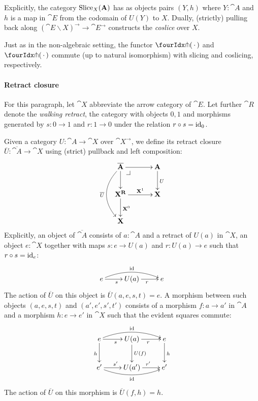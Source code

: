 \documentclass[reqno,10pt,a4paper,oneside]{amsart}
\begin{document}
Explicitly, the category $\operatorname{Slice}_X(\mathbf{A})$ has as objects pairs $(Y, h)$ where $Y : \cat{A}$ and $h$ is a map in $\cat{E}$ from the codomain of $U(Y)$ to $X$.
Dually, (strictly) pulling back along $(\cat{E} \backslash X)^{\to} \to \cat{E}^{\to}$ constructs the \emph{coslice} over $X$.

\begin{remark}
\label{pitchfork-slicing}
Just as in the non-algebraic setting, the functor $\liftr{\brarghole}$ and $\liftl{\brarghole}$ commute (up to natural isomorphism) with slicing and coslicing, respectively.
\end{remark}

\paragraph{Retract closure}

For this paragraph, let $\cat{X}$ abbreviate the arrow category of $\cat{E}$.
Let further $\cat{R}$ denote the \emph{walking retract}, \ie the category with objects $0, 1$ and morphisms generated by $s : 0 \to 1$ and $r : 1 \to 0$ under the relation $r \mathbin{\circ} s = \operatorname{id}_0$.

Given a category $U : \cat{A} \to \cat{X}$ over $\cat{X}^{\to}$, we define its retract closure $\overline{U} : \overline{\cat{A}} \to \cat{X}$ using (strict) pullback and left composition:
\[
\xymatrix@C+1em{
  \overline{\cat{A}}
  \ar[r]
  \ar[d]
  \ar@/_2em/[dd]_{\overline{U}}
  \pullback{dr}
&
  \cat{A}
  \ar[d]^{U}
\\
  \cat{X}^{\cat{R}}
  \ar[r]^-{\cat{X}^1}
  \ar[d]^{\cat{X}^0}
&
  \cat{X}
\\
  \cat{X}
}
\]
Explicitly, an object of $\overline{\cat{A}}$ consists of $a : \cat{A}$ and a retract of $U(a)$ in $\cat{X}$, \ie an object $e : \cat{X}$ together with maps $s : e \to U(a)$ and $r : U(a) \to e$ such that $r \mathbin{\circ} s = \operatorname{id}_e$:
\[
\xymatrix{
  e
  \ar[r]_{s}
  \ar@/^1em/[rr]^{\id}
&
  U(a)
  \ar[r]_{r}
&
  e
}
\]
The action of $\overline{U}$ on this object is $\overline{U}(a, e, s, t) = e$.
A morphism between such objects $(a, e, s, t)$ and $(a', e', s', t')$ consists of a morphism $f : a \to a'$ in $\cat{A}$ and a morphism $h : e \to e'$ in $\cat{X}$ such that the evident squares commute:
\[
\xymatrix{
  e
  \ar[r]_{s}
  \ar@/^1em/[rr]^{\id}
  \ar[d]_{h}
&
  U(a)
  \ar[r]_{r}
  \ar[d]^{U(f)}
&
  e
  \ar[d]^{h}
\\
  e'
  \ar[r]^{s'}
  \ar@/_1em/[rr]_{\id}
&
  U(a')
  \ar[r]^{r'}
&
  e'
}
\]
The action of $\overline{U}$ on this morphism is $\overline{U}(f, h) = h$.
\end{document}
